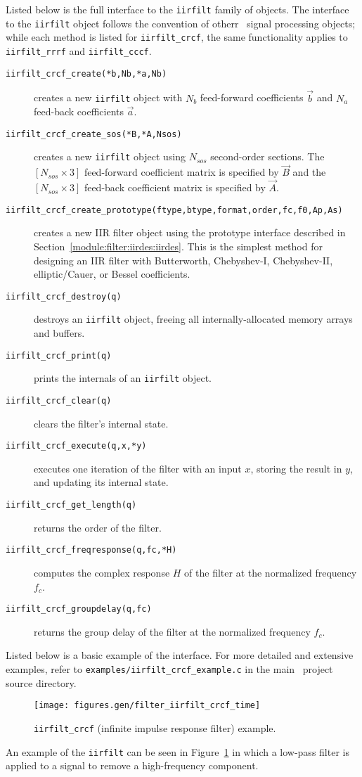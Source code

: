 Listed below is the full interface to the {\tt iirfilt} family of
objects.
The interface to the {\tt iirfilt} object follows the convention of
otherr \liquid\ signal processing objects;
while each method is listed for {\tt iirfilt\_crcf}, the same
functionality applies to {\tt iirfilt\_rrrf} and {\tt iirfilt\_cccf}.
%
\begin{description}
\item[{\tt iirfilt\_crcf\_create(*b,Nb,*a,Nb)}]
    creates a new {\tt iirfilt} object with
    $N_b$ feed-forward coefficients $\vec{b}$ and
    $N_a$ feed-back coefficients $\vec{a}$.
\item[{\tt iirfilt\_crcf\_create\_sos(*B,*A,Nsos)}]
    creates a new {\tt iirfilt} object using $N_{sos}$ second-order
    sections.
    The $[N_{sos} \times 3]$ feed-forward coefficient matrix is
    specified by $\vec{B}$ and
    the $[N_{sos} \times 3]$ feed-back coefficient matrix is
    specified by $\vec{A}$.
\item[{\tt iirfilt\_crcf\_create\_prototype(ftype,btype,format,order,fc,f0,Ap,As)}]
    creates a new IIR filter object using the prototype interface
    described in Section~\ref{module:filter:iirdes:iirdes}.
    This is the simplest method for designing an IIR filter with
    Butterworth, Chebyshev-I, Chebyshev-II, elliptic/Cauer, or Bessel
    coefficients.
\item[{\tt iirfilt\_crcf\_destroy(q)}]
    destroys an {\tt iirfilt} object, freeing all internally-allocated memory
    arrays and buffers.
\item[{\tt iirfilt\_crcf\_print(q)}]
    prints the internals of an {\tt iirfilt} object.
\item[{\tt iirfilt\_crcf\_clear(q)}]
    clears the filter's internal state.
\item[{\tt iirfilt\_crcf\_execute(q,x,*y)}]
    executes one iteration of the filter with an input $x$, storing the
    result in $y$, and updating its internal state.
\item[{\tt iirfilt\_crcf\_get\_length(q)}]
    returns the order of the filter.
\item[{\tt iirfilt\_crcf\_freqresponse(q,fc,*H)}]
    computes the complex response $H$ of the filter at the normalized
    frequency $f_c$.
\item[{\tt iirfilt\_crcf\_groupdelay(q,fc)}]
    returns the group delay of the filter at the normalized
    frequency $f_c$.
\end{description}
%
Listed below is a basic example of the interface.
For more detailed and extensive examples, refer to
{\tt examples/iirfilt\_crcf\_example.c}
in the main \liquid\ project source directory.
%

%
\begin{figure}
\centering
  \texttt{[image: figures.gen/filter\_iirfilt\_crcf\_time]}
\caption{
    {\tt iirfilt\_crcf} (infinite impulse response filter)
    example.}
\label{fig:module:filter:iirfilt_crcf}
\end{figure}
%
An example of the {\tt iirfilt} can be seen in
Figure~\ref{fig:module:filter:iirfilt_crcf}
in which a low-pass filter is applied to a signal to remove a
high-frequency component.


